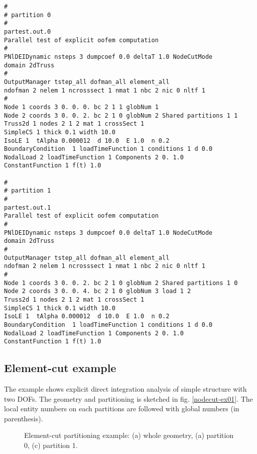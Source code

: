 \documentclass[draft]{article}
\begin{document}
\begin{verbatim}
#
# partition 0
#
partest.out.0
Parallel test of explicit oofem computation
#
PNlDEIDynamic nsteps 3 dumpcoef 0.0 deltaT 1.0 NodeCutMode
domain 2dTruss
#
OutputManager tstep_all dofman_all element_all
ndofman 2 nelem 1 ncrosssect 1 nmat 1 nbc 2 nic 0 nltf 1
#
Node 1 coords 3 0. 0. 0. bc 2 1 1 globNum 1 
Node 2 coords 3 0. 0. 2. bc 2 1 0 globNum 2 Shared partitions 1 1
Truss2d 1 nodes 2 1 2 mat 1 crossSect 1
SimpleCS 1 thick 0.1 width 10.0
IsoLE 1  tAlpha 0.000012  d 10.0  E 1.0  n 0.2  
BoundaryCondition  1 loadTimeFunction 1 conditions 1 d 0.0
NodalLoad 2 loadTimeFunction 1 Components 2 0. 1.0
ConstantFunction 1 f(t) 1.0

#
# partition 1
#
partest.out.1
Parallel test of explicit oofem computation
#
PNlDEIDynamic nsteps 3 dumpcoef 0.0 deltaT 1.0 NodeCutMode
domain 2dTruss
#
OutputManager tstep_all dofman_all element_all
ndofman 2 nelem 1 ncrosssect 1 nmat 1 nbc 2 nic 0 nltf 1
#
Node 1 coords 3 0. 0. 2. bc 2 1 0 globNum 2 Shared partitions 1 0
Node 2 coords 3 0. 0. 4. bc 2 1 0 globNum 3 load 1 2 
Truss2d 1 nodes 2 1 2 mat 1 crossSect 1
SimpleCS 1 thick 0.1 width 10.0
IsoLE 1  tAlpha 0.000012  d 10.0  E 1.0  n 0.2  
BoundaryCondition  1 loadTimeFunction 1 conditions 1 d 0.0
NodalLoad 2 loadTimeFunction 1 Components 2 0. 1.0
ConstantFunction 1 f(t) 1.0
\end{verbatim}

\subsection{Element-cut example}
The example shows explicit direct integration analysis of
simple structure with two DOFs. The geometry and partitioning is sketched in
fig. \ref{nodecut-ex01}. The local entity numbers on each partitions
are followed with global numbers (in parenthesis).

\begin{figure}[htb]
\caption{Element-cut partitioning example: (a) whole geometry,
(a) partition 0, (c) partition 1.}
\label{elmentcut-ex02}
\end{figure}
\end{document}
